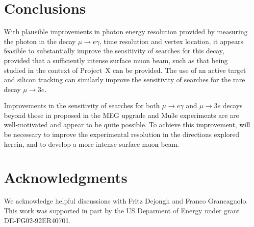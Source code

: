 \section{Conclusions}
\label{conclusions}

With plausible improvements in photon energy resolution provided by measuring the photon in the decay $\mu \to e \gamma$, time resolution and vertex location, it appears feasible to substantially improve the sensitivity of searches for this decay, provided that a sufficiently intense surface muon beam, such as that being studied in the context of Project~X can be provided. The use of an active target and silicon tracking can similarly improve the sensitivity of searches for the rare decay $\mu \to 3e$.

Improvements in the sensitivity of searches for both $\mu \to e \gamma$ and $\mu \to 3e$ decays beyond those in proposed in the MEG upgrade and Mu3e experiments are are well-motivated and appear to be quite possible. To achieve this improvement, will be necessary to improve the experimental resolution in the directions explored herein, and to develop a more intense surface muon beam.

\section{Acknowledgments}
\label{ack}

We acknowledge helpful discussions with Fritz Dejongh and Franco Grancagnolo.
This work was supported in part by the US Deparment of Energy under grant DE-FG02-92ER40701.

